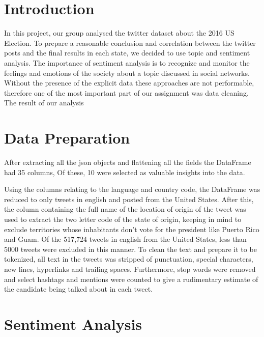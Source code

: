 \documentclass{article}
\begin{document}
  \tableofcontents
  \thispagestyle{empty}
  \pagebreak
  \setcounter{page}{1}
  \setcounter{section}{0}
  \setcounter{figure}{0}
  \section{Introduction}
  In this project, our group analysed the twitter dataset about the
  2016 US Election. To prepare a reasonable conclusion and correlation
  between the twitter posts and the final results in each state, we
  decided to use topic and sentiment analysis. The importance of
  sentiment analysis is to recognize and monitor the feelings and
  emotions of the society about a topic discussed in social
  networks. Without the presence of the explicit data these approaches
  are not performable, therefore one of the most important part of our
  assignment was data cleaning. The result of our analysis
  
  \section{Data Preparation}
  After extracting all the json objects and flattening all the fields
  the DataFrame had 35 columns, Of these, 10 were selected as valuable
  insights into the data.%
  
  Using the columns relating to the language and country code, the
  DataFrame was reduced to only tweets in english and posted from the
  United States. After this, the column containing the full name of
  the location of origin of the tweet was used to extract the two
  letter code of the state of origin, keeping in mind to exclude
  territories whose inhabitants don’t vote for the president like
  Puerto Rico and Guam. Of the 517,724 tweets in english from the
  United States, less than 5000 tweets were excluded in this
  manner. To clean the text and prepare it to be tokenized, all text
  in the tweets was stripped of punctuation, special characters, new
  lines, hyperlinks and trailing spaces. Furthermore, stop words were
  removed and select hashtags and mentions were counted to give a
  rudimentary estimate of the candidate being talked about in each
  tweet.
  
  \section{Sentiment Analysis}
\end{document}
